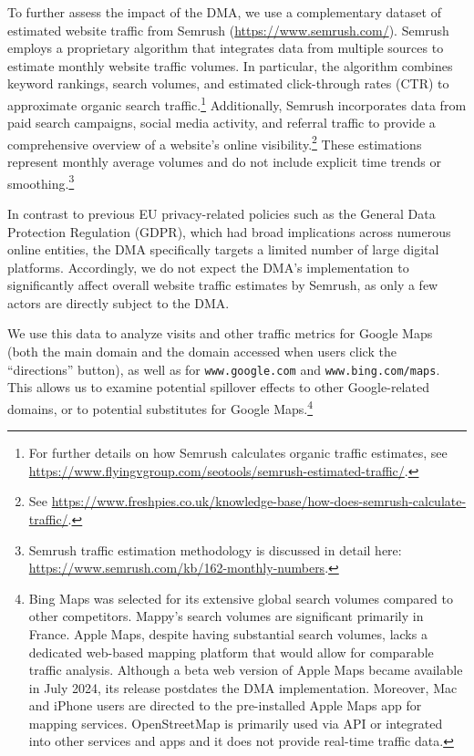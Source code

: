 \documentclass[11pt]{article}
\begin{document}
	To further assess the impact of the DMA, we use a complementary dataset of estimated website traffic from Semrush (\href{https://www.semrush.com/}{https://www.semrush.com/}). Semrush employs a proprietary algorithm that integrates data from multiple sources to estimate monthly website traffic volumes. In particular, the algorithm combines keyword rankings, search volumes, and estimated click-through rates (CTR) to approximate organic search traffic.\footnote{For further details on how Semrush calculates organic traffic estimates, see \href{https://www.flyingvgroup.com/seotools/semrush-estimated-traffic/}{https://www.flyingvgroup.com/seotools/semrush-estimated-traffic/}.} Additionally, Semrush incorporates data from paid search campaigns, social media activity, and referral traffic to provide a comprehensive overview of a website's online visibility.\footnote{See \href{https://www.freshpies.co.uk/knowledge-base/how-does-semrush-calculate-traffic/}{https://www.freshpies.co.uk/knowledge-base/how-does-semrush-calculate-traffic/}.} These estimations represent monthly average volumes and do not include explicit time trends or smoothing.\footnote{Semrush traffic estimation methodology is discussed in detail here: \href{https://www.semrush.com/kb/162-monthly-numbers}{https://www.semrush.com/kb/162-monthly-numbers}.}
	
	In contrast to previous EU privacy-related policies such as the General Data Protection Regulation (GDPR), which had broad implications across numerous online entities, the DMA specifically targets a limited number of large digital platforms. Accordingly, we do not expect the DMA's implementation to significantly affect overall website traffic estimates by Semrush, as only a few actors are directly subject to the DMA.
	
	We use this data to analyze visits and other traffic metrics for Google Maps (both the main domain and the domain accessed when users click the ``directions'' button), as well as for \texttt{www.google.com} and \texttt{www.bing.com/maps}. This allows us to examine potential spillover effects to other Google-related domains, or to potential substitutes for Google Maps.\footnote{Bing Maps was selected for its extensive global search volumes compared to other competitors. Mappy’s search volumes are significant primarily in France. Apple Maps, despite having substantial search volumes, lacks a dedicated web-based mapping platform that would allow for comparable traffic analysis. Although a beta web version of Apple Maps became available in July 2024, its release postdates the DMA implementation. Moreover, Mac and iPhone users are directed to the pre-installed Apple Maps app for mapping services. OpenStreetMap is primarily used via API or integrated into other services and apps and it does not provide real-time traffic data.} 
	
\end{document}

